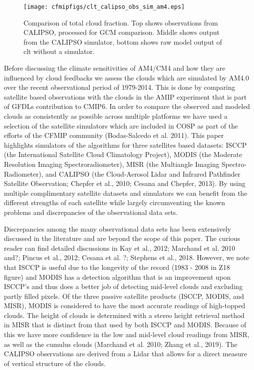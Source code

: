 \documentclass[11pt]{article}   	%
\begin{document}
\begin{figure}
  \texttt{[image: cfmipfigs/clt\_calipso\_obs\_sim\_am4.eps]}
  \caption{Comparison of total cloud fraction.  Top shows observations from CALIPSO, processed for GCM comparison.  Middle 
  shows output from the CALIPSO simulator, bottom shows raw model output of clt without a simulator.}
  \label{fig:calipso_sim_vs_mod}
\end{figure}

Before discussing the climate sensitivities of AM4/CM4 and how they are influenced by cloud feedbacks we assess
the clouds which are simulated by AM4.0 over the recent observational period of 1979-2014.  This is done by comparing
satellite based observations with the clouds in the AMIP experiment that is part of GFDLs contribution to CMIP6.  In 
order to compare the observed and modeled clouds as consistently as possible across multiple platforms we have 
used a selection of the satellite simulators which are included in COSP as part of the efforts of the CFMIP community 
(Bodas-Salcedo et al. 2011).  This paper highlights simulators of the algorithms for three satellites based datasets: 
ISCCP (the International Satellite Cloud Climatology Project), MODIS (the Moderate Resolution Imaging Spectroradiometer), 
MISR (the Multiangle Imaging Spectro-Radiometer), and CALIPSO (the Cloud-Aerosol Lidar and Infrared Pathfinder 
Satellite Observation; Chepfer et al., 2010; Cesana and Chepfer, 2013).  By using multiple complimentary satellite 
datasets and simulators we can benefit from 
the different strengths of each satellite while largely circumventing the known problems and discrepancies of the 
observational data sets.      

Discrepancies among the many observational data sets has been extensively discussed in the literature and are 
beyond the scope of this paper.  The curious reader can find detailed discussions in Kay et al., 2012; 
Marchand et al. 2010 and?; Pincus et al., 2012; Cesana et al. ?; Stephens et al., 2018.  However, we note that ISCCP is useful due to 
the longevity of the record (1983 - 2008 in Z18 figure) and MODIS has a detection algorithm that is an improvement upon ISCCP's and
thus does a better job of detecting mid-level clouds and excluding partly filled pixels.   Of the three passive satellite products 
(ISCCP, MODIS, and MISR), MODIS is considered to have the most accurate readings of high-topped clouds.  
The height of clouds is determined with a stereo height retrieval method in MISR that is distinct from that used by
both ISCCP and MODIS.  Because of this we have more confidence in the low and mid-level cloud readings 
from MISR, as well as the cumulus clouds (Marchand et al. 2010; Zhang et al., 2019).   The CALIPSO observations
are derived from a Lidar that allows for a direct measure of vertical structure of the clouds.  
\end{document}
